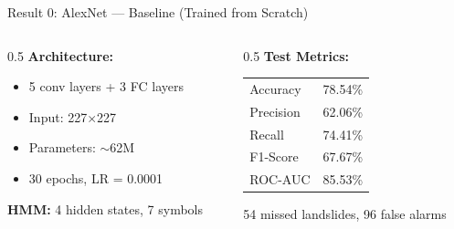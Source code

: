 \documentclass[aspectratio=169]{beamer}
\begin{document}
\begin{frame}{Result 0: AlexNet --- Baseline (Trained from Scratch)}
    \begin{columns}
        \begin{column}{0.5\textwidth}
            \textbf{Architecture:}
            \begin{itemize}
                \item 5 conv layers + 3 FC layers
                \item Input: 227$\times$227
                \item Parameters: $\sim$62M
                \item 30 epochs, LR = 0.0001
            \end{itemize}

            \vspace{0.3cm}
            \textbf{HMM:} 4 hidden states, 7 symbols
        \end{column}
        \begin{column}{0.5\textwidth}
            \textbf{Test Metrics:}
            \begin{table}
                \centering
                \small
                \begin{tabular}{lr}
                    \toprule
                    Accuracy & 78.54\% \\
                    Precision & 62.06\% \\
                    Recall & 74.41\% \\
                    F1-Score & 67.67\% \\
                    ROC-AUC & 85.53\% \\
                    \bottomrule
                \end{tabular}
            \end{table}
            \small 54 missed landslides, 96 false alarms
        \end{column}
    \end{columns}
\end{frame}
\end{document}

